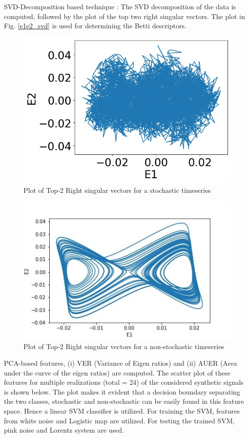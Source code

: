 \documentclass[journal]{IEEEtran}
\begin{document}
SVD-Decomposition based technique : The SVD decomposition of the data is computed, followed by the plot of the top two right singular vectors. The plot in Fig. \ref{e1e2_svd} is used for determining the Betti descriptors.
\begin{figure}[ht]
  \centering
  \includegraphics[width=0.8\linewidth]{svd_white_noise.jpg}
  \caption{Plot of Top-2 Right singular vectors for a stochastic timeseries}
  \label{ele2_svd}
\end{figure}
\begin{figure}[ht]
  \centering
  \includegraphics[width=0.8\linewidth]{svd_lorenz.JPG}
  \caption{Plot of Top-2 Right singular vectors for a non-stochastic timeseries}
  \label{ele2_svd_ns}
\end{figure}
PCA-based features, (i) VER (Variance of Eigen ratios) and (ii) AUER (Area under the curve of the eigen ratios) are computed. The scatter plot of these features for multiple realizations (total = 24) of the considered synthetic signals is shown below. The plot makes it evident that a decision boundary separating the two classes, stochastic and non-stochastic can be easily found in this feature space. Hence a linear SVM classifier is utilized. For training the SVM, features from white noise and Logistic map are utilized. For testing the trained SVM, pink noise and Lorentz system are used.
\end{document}
